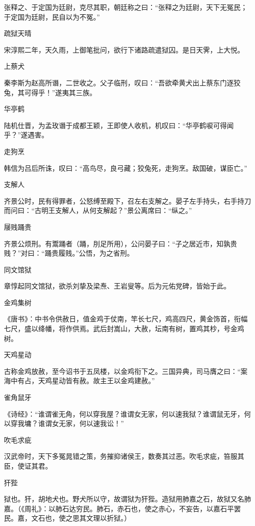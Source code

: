 \documentclass[a4paper,12pt,UTF8,twoside]{ctexbook}
\begin{document}
    张释之、于定国为廷尉，克尽其职，朝廷称之曰：“张释之为廷尉，天下无冤民；于定国为廷尉，民自以为不冤。”
    
    疏狱天晴
    
    宋淳熙二年，天久雨，上御笔批问，欲行下诸路疏遣狱囚。是日天霁，上大悦。
    
    上蔡犬
    
    秦李斯为赵高所谮，二世收之。父子临刑，叹曰：“吾欲牵黄犬出上蔡东门逐狡兔，其可得乎！”遂夷其三族。
    
    华亭鹤
    
    陆机仕晋，为孟玫谮于成都王颖，王即使人收机，机叹曰：“华亭鹤唳可得闻乎？”遂遇害。
    
    走狗烹
    
    韩信为吕后所诛，叹曰：“高鸟尽，良弓藏；狡兔死，走狗烹。敌国破，谋臣亡。”
    
    支解人
    
    齐景公时，民有得罪者，公怒缚至殿下，召左右支解之。晏子左手持头，右手持刀而问曰：“古明王支解人，从何支解起？”景公离席曰：“纵之。”
    
    屦贱踊贵
    
    齐景公烦刑。有鬻踊者（踊，刖足所用），公问晏子曰：“子之居近市，知孰贵贱？”对曰：“踊贵履贱。”公悟，为之省刑。
    
    同文馆狱
    
    章惇起同文馆狱，欲杀刘挚及梁焘、王岩叟等。后为元佑党碑，皆始于此。
    
    金鸡集树
    
    《唐书》：中书令供赦日，值金鸡于仗南，竿长七尺，鸡高四尺，黄金饰首，衔幅七尺，盛以绛幡，将作供焉。武后封嵩山，大赦，坛南有树，置鸡其杪，号金鸡树。
    
    天鸡星动
    
    古称金鸡放赦，至今诏书于五凤楼，以金鸡衔下之。三国异典，司马膺之曰：“案海中有占，天鸡星动皆有赦。故主王以金鸡建赦。”
    
    雀角鼠牙
    
    《诗经》：“谁谓雀无角，何以穿我屋？谁谓女无家，何以速我狱？谁谓鼠无牙，何以穿我墉？谁谓女无家，何以速我讼！”
    
    吹毛求疵
    
    汉武帝时，天下多冤晁错之策，务摧抑诸侯王，数奏其过恶。吹毛求疵，笞服其臣，使证其君。
    
    犴狴
    
    狱也。犴，胡地犬也。野犬所以守，故谓狱为犴狴。造狱用肺嘉之石，故狱又名肺嘉。（《周礼》：以肺石达穷民。肺石，赤石也，使之赤心，不妄告，以嘉石平罢民。嘉，文石也，使之思其文理以折狱。）
    
\end{document}
